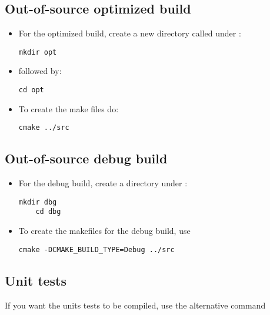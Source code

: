 \documentclass[11pt,fleqn]{book} %
\begin{document}
\subsection{ Out-of-source optimized build}
\begin{itemize}
  \item For the optimized build, create a new directory called  under :

\begin{lstlisting}[backgroundcolor=\color{background}]
    mkdir opt
\end{lstlisting}

  \item followed by:

\begin{lstlisting}[backgroundcolor=\color{background}]
    cd opt
\end{lstlisting}

  \item To create the make files do:

\begin{lstlisting}[backgroundcolor=\color{background}]
    cmake ../src
\end{lstlisting}
\end{itemize}

\subsection{ Out-of-source debug build}
\begin{itemize}
 \item For the debug build, create a directory  under :

\begin{lstlisting}[backgroundcolor=\color{background}]
    mkdir dbg
    cd dbg
\end{lstlisting}

 \item To create the makefiles for the debug build, use

\begin{lstlisting}[backgroundcolor=\color{background}]
    cmake -DCMAKE_BUILD_TYPE=Debug ../src
\end{lstlisting}

\end{itemize}

\subsection{ Unit tests}
If you want the units tests to be compiled, use the alternative command
\end{document}
